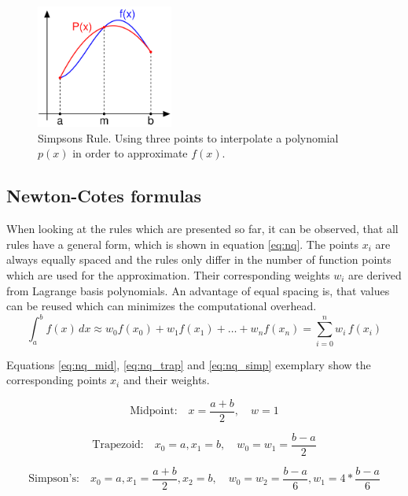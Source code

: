 \begin{figure}[htbp]
	\centering
		\includegraphics[width=0.40\textwidth]{graphics/simpsons2.png}
	\caption{Simpsons Rule. Using three points to interpolate a polynomial $p(x)$ in order to approximate $f(x)$.}
	\label{fig:Simpsons_rule2}
\end{figure}



\subsection{Newton-Cotes formulas}
When looking at the rules which are presented so far, it can be observed, that all rules have a general form, which is shown in equation \ref{eq:nq}. The points $x_i$ are always equally spaced and the rules only differ in the number of function points which are used for the approximation. Their corresponding weights $w_i$ are derived from Lagrange basis polynomials. An advantage of equal spacing is, that values can be reused which can minimizes the computational overhead.
\begin{equation}
\int_a^b f(x) \,dx \approx w_0 f(x_0) + w_1 f(x_1) + \dots + w_n f(x_n) = \sum_{i=0}^n w_i\, f(x_i)
\label{eq:nq}
\end{equation}

Equations \ref{eq:nq_mid}, \ref{eq:nq_trap} and \ref{eq:nq_simp} exemplary show the corresponding points $x_i$ and their weights.

\begin{equation}
\text{Midpoint:} \quad  x = \frac{a + b}{2}, \quad w = 1
\label{eq:nq_mid}
\end{equation}

\begin{equation}
\text{Trapezoid:} \quad x_0 = a, x_1 = b, \quad w_0 = w_1 = \frac{b-a}{2}
\label{eq:nq_trap}
\end{equation}

\begin{equation}
\text{Simpson's:}
\quad x_0 = a, x_1 = \frac{a+b}{2}, x_2 = b, 
\quad w_0 = w_2 = \frac{b-a}{6}, w_1 = 4 * \frac{b-a}{6}
\label{eq:nq_simp}
\end{equation}

